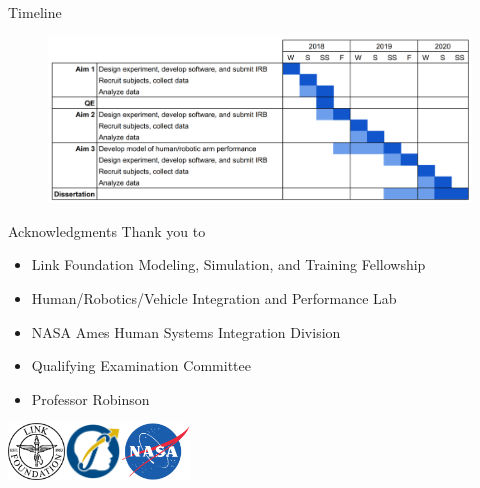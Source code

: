 \documentclass[10pt]{beamer}
\begin{document}
\begin{frame}[fragile]{Timeline}
  \begin{figure}[h!]
    \begin{center}
      \includegraphics[width=\linewidth]{../img/image1.png}
    \end{center}
  \end{figure}
\end{frame}

\begin{frame}[fragile]{Acknowledgments}
  Thank you to
  \begin{itemize}
    \item Link Foundation Modeling, Simulation, and Training Fellowship
    \item Human/Robotics/Vehicle Integration and Performance Lab
    \item NASA Ames Human Systems Integration Division
    \item Qualifying Examination Committee
    \item Professor Robinson
  \end{itemize}
  \hfill\includegraphics[height=1.5cm]{../img/linkfoundation.png}\includegraphics[height=1.5cm]{../img/hrvip.png}\includegraphics[height=1.5cm]{../img/nasa.png}
\end{frame}
\end{document}
